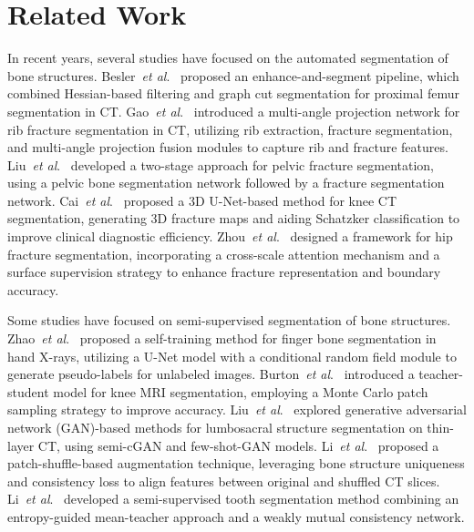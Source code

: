\section{Related Work}
In recent years, several studies have focused on the automated segmentation of bone structures.
Besler~\textit{et al}.~\cite{besler_2021_Bone} proposed an enhance-and-segment pipeline, which combined Hessian-based filtering and graph cut segmentation for proximal femur segmentation in CT.
Gao~\textit{et al}.~\cite{gao_2022_Deep} introduced a multi-angle projection network for rib fracture segmentation in CT, utilizing rib extraction, fracture segmentation, and multi-angle projection fusion modules to capture rib and fracture features.
Liu~\textit{et al}.~\cite{liu_2023_Pelvic} developed a two-stage approach for pelvic fracture segmentation, using a pelvic bone segmentation network followed by a fracture segmentation network.
Cai~\textit{et al}.~\cite{cai_2024_Automatic} proposed a 3D U-Net-based method for knee CT segmentation, generating 3D fracture maps and aiding Schatzker classification to improve clinical diagnostic efficiency.
Zhou~\textit{et al}.~\cite{zhou_2024_CrossScale} designed a framework for hip fracture segmentation, incorporating a cross-scale attention mechanism and a surface supervision strategy to enhance fracture representation and boundary accuracy.

Some studies have focused on semi-supervised segmentation of bone structures.
Zhao~\textit{et al}.~\cite{zhao_2019_SemiSupervised} proposed a self-training method for finger bone segmentation in hand X-rays, utilizing a U-Net model with a conditional random field module to generate pseudo-labels for unlabeled images.
Burton~\textit{et al}.~\cite{burton_2020_Semisupervised} introduced a teacher-student model for knee MRI segmentation, employing a Monte Carlo patch sampling strategy to improve accuracy.
Liu~\textit{et al}.~\cite{liu_2020_Semisupervised} explored generative adversarial network (GAN)-based methods for lumbosacral structure segmentation on thin-layer CT, using semi-cGAN and few-shot-GAN models.
Li~\textit{et al}.~\cite{li_2023_Patchshufflebased} proposed a patch-shuffle-based augmentation technique, leveraging bone structure uniqueness and consistency loss to align features between original and shuffled CT slices.
Li~\textit{et al}.~\cite{li_2025_Semisupervised} developed a semi-supervised tooth segmentation method combining an entropy-guided mean-teacher approach and a weakly mutual consistency network.